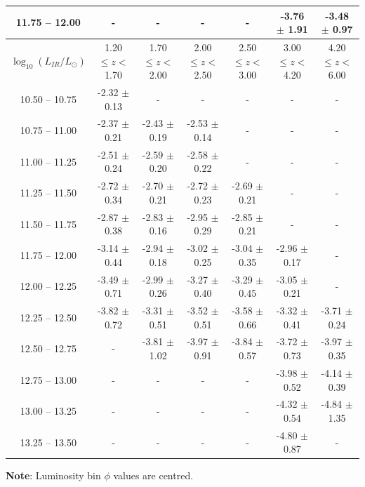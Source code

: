 \begin{table}
\begin{center}
\begin{tabular}{@{}ccccccc@{}}
        11.75 -- 12.00 & -                & -                & -                & -                & -3.76 $\pm$ 1.91 & -3.48 $\pm$ 0.97 \\
        \hline
        $\log_{10}(L_{IR}/L_{\odot})$ & 1.20 $\leq z <$ 1.70 & 1.70 $\leq z <$ 2.00 & 2.00 $\leq z <$ 2.50 & 2.50 $\leq z <$ 3.00 & 3.00 $\leq z <$ 4.20 & 4.20 $\leq z <$ 6.00  \\
        \hline
        10.50 -- 10.75 & -2.32 $\pm$ 0.13 & - & - & - & - & - \\
        10.75 -- 11.00 & -2.37 $\pm$ 0.21 & -2.43 $\pm$ 0.19 & -2.53 $\pm$ 0.14 & - & - & - \\
        11.00 -- 11.25 & -2.51 $\pm$ 0.24 & -2.59 $\pm$ 0.20 & -2.58 $\pm$ 0.22 & - & - & - \\
        11.25 -- 11.50 & -2.72 $\pm$ 0.34 & -2.70 $\pm$ 0.21 & -2.72 $\pm$ 0.23 & -2.69 $\pm$ 0.21 & - & - \\
        11.50 -- 11.75 & -2.87 $\pm$ 0.38 & -2.83 $\pm$ 0.16 & -2.95 $\pm$ 0.29 & -2.85 $\pm$ 0.21 & - & - \\
        11.75 -- 12.00 & -3.14 $\pm$ 0.44 & -2.94 $\pm$ 0.18 & -3.02 $\pm$ 0.25 & -3.04 $\pm$ 0.35 & -2.96 $\pm$ 0.17 & - \\
        12.00 -- 12.25 & -3.49 $\pm$ 0.71 & -2.99 $\pm$ 0.26 & -3.27 $\pm$ 0.40 & -3.29 $\pm$ 0.45 & -3.05 $\pm$ 0.21 & - \\
        12.25 -- 12.50 & -3.82 $\pm$ 0.72 & -3.31 $\pm$ 0.51 & -3.52 $\pm$ 0.51 & -3.58 $\pm$ 0.66 & -3.32 $\pm$ 0.41 & -3.71 $\pm$ 0.24 \\
        12.50 -- 12.75 & -                & -3.81 $\pm$ 1.02 & -3.97 $\pm$ 0.91 & -3.84 $\pm$ 0.57 & -3.72 $\pm$ 0.73 & -3.97 $\pm$ 0.35 \\
        12.75 -- 13.00 & -                & -                & -                & -                & -3.98 $\pm$ 0.52 & -4.14 $\pm$ 0.39 \\
        13.00 -- 13.25 & -                & -                & -                & -                & -4.32 $\pm$ 0.54 & -4.84 $\pm$ 1.35 \\
        13.25 -- 13.50 & -                & -                & -                & -                & -4.80 $\pm$ 0.87 & -
        \botrule
    \end{tabular}
    \end{center}
    \begin{tabnote}
        {\textbf{Note}: Luminosity bin $\phi$ values are centred.}\tnp
    \end{tabnote}
\end{table}

